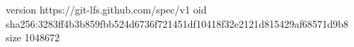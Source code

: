 version https://git-lfs.github.com/spec/v1
oid sha256:3283ff4b3b859fbb524d6736f721451df10418f32e2121d815429af68571d9b8
size 1048672
